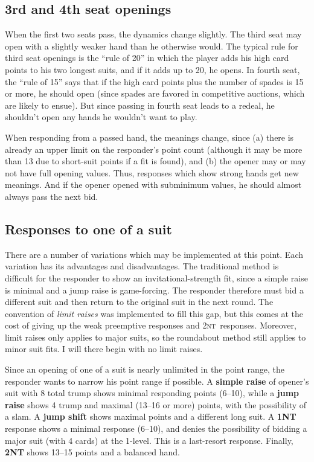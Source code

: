 \documentclass[11pt]{article}
\def\NT{\textsc{nt}}
\begin{document}
\subsection{3rd and 4th seat openings}
When the first two seats pass, the dynamics change slightly.  The
third seat may open with a slightly weaker hand than he otherwise
would.  The typical rule for third seat openings is the ``rule of 20''
in which the player adds his high card points to his two longest
suits, and if it adds up to 20, he opens.  In fourth seat, the ``rule
of 15'' says that if the high card points plus the number of spades is
15 or more, he should open (since spades are favored in competitive
auctions, which are likely to ensue).  But since passing in fourth
seat leads to a redeal, he shouldn't open any hands he wouldn't want
to play.

When responding from a passed hand, the meanings change, since (a) there
is already an upper limit on the responder's point count (although it
may be more than 13 due to short-suit points if a fit is found), and
(b) the opener may or may not have full opening values.  Thus, responses
which show strong hands get new meanings.  And if the opener opened
with subminimum values, he should almost always pass the next bid.

\subsection{Responses to one of a suit}
There are a number of variations which may be implemented at this
point.  Each variation has its advantages and disadvantages.  The
traditional method is difficult for the responder to show an
invitational-strength fit, since a simple raise is minimal and a jump
raise is game-forcing.  The responder therefore must bid a different
suit and then return to the original suit in the next round.  The
convention of \emph{limit raises} was implemented to fill this gap,
but this comes at the cost of giving up the weak preemptive responses
and 2\NT\ responses.  Moreover, limit raises only applies to major
suits, so the roundabout method still applies to minor suit fits.  I
will there begin with no limit raises.

Since an opening of one of a suit is nearly unlimited in the point
range, the responder wants to narrow his point range if possible.  A
\textbf{simple raise} of opener's suit with 8 total trump shows
minimal responding points (6--10), while a \textbf{jump raise} shows 4
trump and maximal (13--16 or more) points, with the possibility of a
slam.  A \textbf{jump shift} shows maximal points and a different long
suit.  A \textbf{1NT} response shows a minimal response (6--10), and 
denies the possibility of bidding a major suit (with 4 cards) at the
1-level.  This is a last-resort response.  Finally, \textbf{2NT} shows
13--15 points and a balanced hand.
\end{document}
